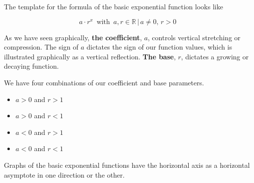 \documentclass{ximera}
\begin{document}
The template for the formula of the basic exponential function looks like




\[  a \cdot r^x   \, \text{ with } \,  a, r \in \mathbb{R} \, | \,  a \ne 0, \, r > 0   \]


As we have seen graphically, \textbf{\textcolor{purple!85!blue}{the coefficient}}, $a$, controls vertical stretching or compression. The sign of $a$ dictates the sign of our function values, which is illustrated graphically as a vertical reflection. \textbf{\textcolor{purple!85!blue}{The base}}, $r$, dictates a growing or decaying function.




We have four combinations of our coefficient and base parameters.

\begin{itemize}
\item $a>0$ and $r>1$
\item $a>0$ and $r<1$
\item $a<0$ and $r>1$
\item $a<0$ and $r<1$
\end{itemize}


Graphs of the basic exponential functions have the horizontal axis as a horizontal asymptote in one direction or the other.
\end{document}
